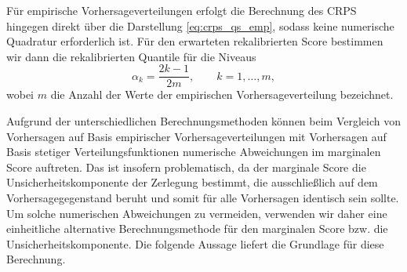 Für empirische Vorhersageverteilungen erfolgt die Berechnung des CRPS hingegen direkt über die Darstellung \eqref{eq:crps_qs_emp}, sodass keine numerische Quadratur erforderlich ist. Für den erwarteten rekalibrierten Score bestimmen wir dann die rekalibrierten Quantile für die Niveaus
\[
\alpha_k=\frac{2k-1}{2m},\qquad k=1,\dots,m,
\]
wobei $m$ die Anzahl der Werte der empirischen Vorhersageverteilung bezeichnet.



Aufgrund der unterschiedlichen Berechnungsmethoden können beim Vergleich von Vorhersagen auf Basis empirischer Vorhersageverteilungen mit Vorhersagen auf Basis stetiger Verteilungsfunktionen numerische Abweichungen im marginalen Score auftreten. Das ist insofern problematisch, da der marginale Score die Unsicherheitskomponente der Zerlegung bestimmt, die ausschließlich auf dem Vorhersagegegenstand beruht und somit für alle Vorhersagen identisch sein sollte. Um solche numerischen Abweichungen zu vermeiden, verwenden wir daher eine einheitliche alternative Berechnungsmethode für den marginalen Score bzw. die Unsicherheitskomponente. Die folgende Aussage liefert die Grundlage für diese Berechnung.

